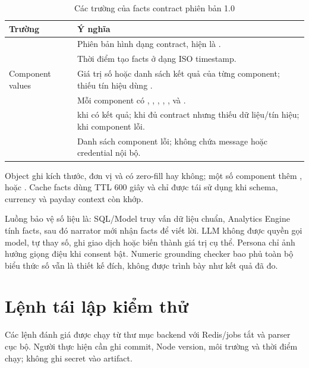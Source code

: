 \begin{table}[H]
  \centering
  \caption{Các trường của facts contract phiên bản 1.0}
  \label{tab:app-facts-contract}
  \begin{tabularx}{\textwidth}{@{}L{4.5cm}Y@{}}
    \toprule
    \textbf{Trường} & \textbf{Ý nghĩa} \\
    \midrule
     & Phiên bản hình dạng contract, hiện là . \\
     & Thời điểm tạo facts ở dạng ISO timestamp. \\
    Component values & Giá trị số hoặc danh sách kết quả của từng component; thiếu tín hiệu dùng . \\
     & Mỗi component có , , , , ,  và . \\
     &  khi có kết quả;  khi đủ contract nhưng thiếu dữ liệu/tín hiệu;  khi component lỗi. \\
     & Danh sách component lỗi; không chứa message hoặc credential nội bộ. \\
    \bottomrule
  \end{tabularx}
\end{table}

Object  ghi kích thước, đơn vị và có zero-fill hay không; một số component thêm ,  hoặc . Cache facts dùng TTL 600 giây và chỉ được tái sử dụng khi schema, currency và payday context còn khớp.

Luồng bảo vệ số liệu là: SQL/Model truy vấn dữ liệu chuẩn, Analytics Engine tính facts, sau đó narrator mới nhận facts để viết lời. LLM không được quyền gọi model, tự thay số, ghi giao dịch hoặc biến  thành giá trị cụ thể. Persona chỉ ảnh hưởng giọng điệu khi consent bật. Numeric grounding checker bao phủ toàn bộ biểu thức số vẫn là thiết kế đích, không được trình bày như kết quả đã đo.

\chapter{Lệnh tái lập kiểm thử}

Các lệnh đánh giá được chạy từ thư mục backend với Redis/jobs tắt và parser cục bộ. Người thực hiện cần ghi commit, Node version, môi trường và thời điểm chạy; không ghi secret vào artifact.

